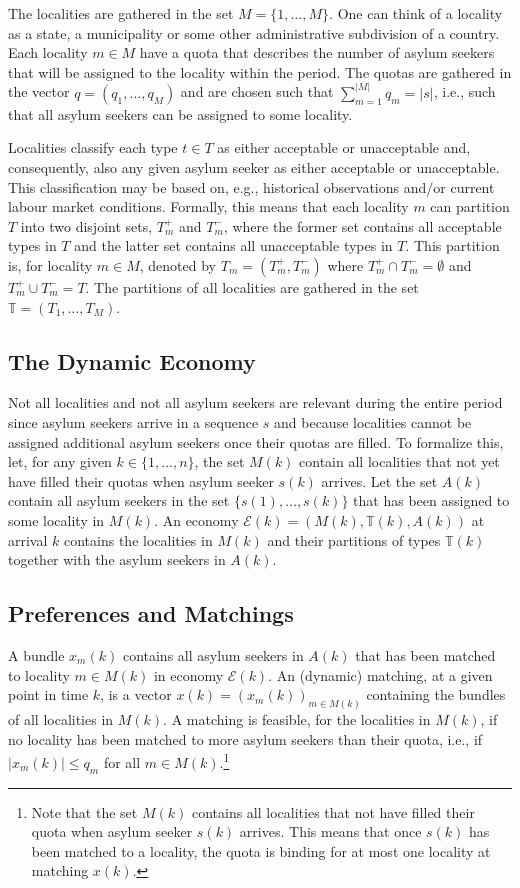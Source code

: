 \documentclass[12pt,fleqn]{article}
\begin{document}
The localities are gathered in the set $M=\{1,\ldots,M\}$. One can think of a locality as a state, a municipality or some other administrative subdivision of a country. Each locality $m\in M$ have a quota that describes the number of asylum seekers that will be assigned to the locality within the period. The quotas are gathered in the vector $q=(q_1,\ldots, q_M)$ and are chosen such that $\sum_{m=1}^{|M|}q_m=|s|$, i.e., such that all asylum seekers can be assigned to some locality.

Localities classify each type $t\in T$ as either acceptable or unacceptable and, consequently, also any given asylum seeker as either acceptable or unacceptable. This classification may be based on, e.g., historical observations and/or current labour market conditions. Formally, this means that each locality $m$ can partition $T$ into two disjoint sets, $T^+_m$ and $T_m^-$, where the former set contains all acceptable types in $T$ and the latter set contains all unacceptable types in $T$. This partition is, for locality $m\in M$, denoted by $T_m=(T^+_m, T_m^-)$ where $T^+_m\cap T_m^-=\emptyset$ and $T^+_m\cup T_m^-=T$. The partitions of all localities are gathered in the set $\mathbb{T}=(T_1,\ldots,T_M)$.

\subsection{The Dynamic Economy}
Not all localities and not all asylum seekers are relevant during the entire period since asylum seekers arrive in a sequence $s$ and because localities cannot be assigned additional asylum seekers once their quotas are filled. To formalize this, let, for any given $k\in \{1,\ldots,n\}$, the set $M(k)$ contain all localities that not yet have filled their quotas when asylum seeker $s(k)$ arrives. Let the set $A(k)$ contain all asylum seekers in the set $\{s(1),\ldots,s(k)\}$ that has been assigned to some locality in $M(k)$. An economy $\mathcal{E}(k)=(M(k),\mathbb{T}(k),A(k))$ at arrival $k$ contains the localities in $M(k)$ and their partitions of types $\mathbb{T}(k)$ together with the asylum seekers in $A(k)$.

\subsection{Preferences and Matchings}
A bundle $x_m(k)$ contains all asylum seekers in $A(k)$ that has been matched to locality $m\in M(k)$ in economy $\mathcal{E}(k)$. An (dynamic) matching, at a given point in time $k$, is a vector $x(k)=(x_m(k))_{m\in M(k)}$ containing the bundles of all localities in $M(k)$. A matching is feasible, for the localities in $M(k)$, if no locality has been matched to more asylum seekers than their quota, i.e., if $|x_m(k)|\leq q_m$ for all $m\in M(k)$.\footnote{Note that the set $M(k)$ contains all localities that not have filled their quota when asylum seeker $s(k)$ arrives. This means that once $s(k)$ has been matched to a locality, the quota is binding for at most one locality at matching $x(k)$.}
\end{document}
